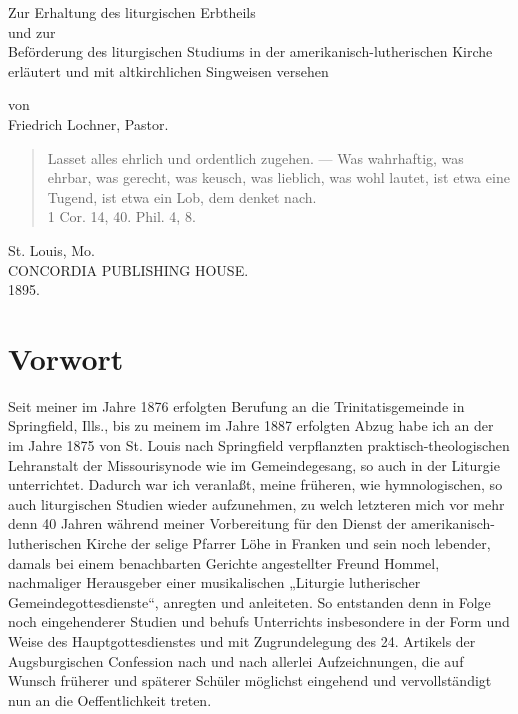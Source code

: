 \begin{titelseite}

Zur Erhaltung des liturgischen Erbtheils\\
und zur\\
Beförderung des liturgischen Studiums in der amerikanisch-lutherischen Kirche erläutert und mit altkirchlichen Singweisen versehen

von\\
Friedrich Lochner, Pastor.

\begin{quote}
Lasset alles ehrlich und ordentlich zugehen. — Was wahrhaftig, was ehrbar, was gerecht, was keusch, was lieblich, was wohl lautet, ist etwa eine Tugend, ist etwa ein Lob, dem denket nach.\\
1 Cor. 14, 40. Phil. 4, 8.
\end{quote}

St. Louis, Mo.\\
CONCORDIA PUBLISHING HOUSE.\\
1895.
\end{titelseite}

\chapter{Vorwort}


Seit meiner im Jahre 1876 erfolgten Berufung an die Trinitatisgemeinde in Springfield, Ills., bis zu meinem im Jahre 1887 erfolgten Abzug habe ich an der im Jahre 1875 von St. Louis nach Springfield verpflanzten praktisch-theologischen Lehranstalt der Missourisynode wie im Gemeindegesang, so auch in der Liturgie unterrichtet. Dadurch war ich veranlaßt, meine früheren, wie hymnologischen, so auch liturgischen Studien wieder aufzunehmen, zu welch letzteren mich vor mehr denn 40 Jahren während meiner Vorbereitung für den Dienst der amerikanisch-lutherischen Kirche der selige Pfarrer Löhe in Franken und sein noch lebender, damals bei einem benachbarten Gerichte angestellter Freund Hommel, nachmaliger Herausgeber einer musikalischen „Liturgie lutherischer Gemeindegottesdienste“, anregten und anleiteten. So entstanden denn in Folge noch eingehenderer Studien und behufs Unterrichts insbesondere in der Form und Weise des Hauptgottesdienstes und mit Zugrundelegung des 24. Artikels der Augsburgischen Confession nach und nach allerlei Aufzeichnungen, die auf Wunsch früherer und späterer Schüler möglichst eingehend und vervollständigt nun an die Oeffentlichkeit treten.

